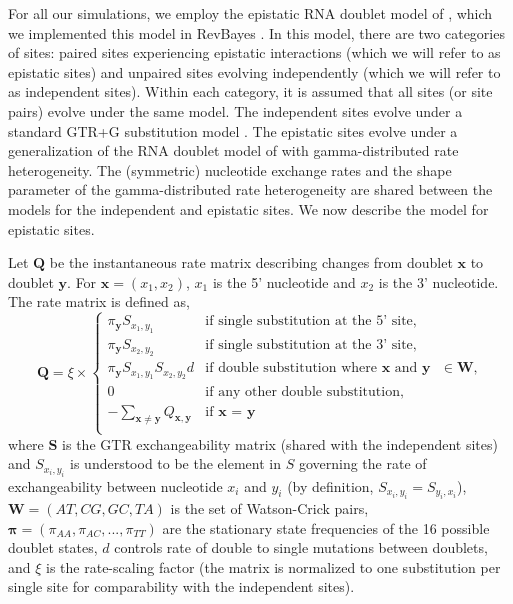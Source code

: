 \documentclass[11pt]{article}
\begin{document}
For all our simulations, we employ the epistatic RNA doublet model of \cite{nasrallah2013phylogenetic}, which we implemented this model in RevBayes \citep{hohna2016revbayes}.
In this model, there are two categories of sites: paired sites experiencing epistatic interactions (which we will refer to as epistatic sites) and unpaired sites evolving independently (which we will refer to as independent sites).
Within each category, it is assumed that all sites (or site pairs) evolve under the same model.
The independent sites evolve under a standard GTR+G substitution model \citep{tavare1986some}.
The epistatic sites evolve under a generalization of the RNA doublet model of \cite{schoniger1994stochastic} with gamma-distributed rate heterogeneity.
The (symmetric) nucleotide exchange rates and the shape parameter of the gamma-distributed rate heterogeneity are shared between the models for the independent and epistatic sites.
We now describe the model for epistatic sites.

Let $\boldsymbol{Q}$ be the instantaneous rate matrix describing changes from doublet $\boldsymbol{x}$ to doublet $\boldsymbol{y}$.
For $\boldsymbol{x} = (x_1, x_2)$, $x_1$ is the 5' nucleotide and $x_2$ is the 3' nucleotide.
The rate matrix is defined as,
\begin{equation}
\label{eq:Q}
\boldsymbol{Q} = \xi \times
\begin{cases}
   \pi_{\boldsymbol{y}} S_{x_1, y_1} & \mbox{if single substitution at the 5' site,} \\
   \pi_{\boldsymbol{y}} S_{x_2, y_2} & \mbox{if single substitution at the 3' site,} \\
   \pi_{\boldsymbol{y}} S_{x_1, y_1} S_{x_2, y_2} d & \mbox{if double substitution where ${\boldsymbol{x}}$ and ${\boldsymbol{y}}$ $\in {\boldsymbol{W}}$,} \\
   0 & \mbox{if any other double substitution,} \\
   - \sum_{\boldsymbol{x} \ne \boldsymbol{y}} Q_{\boldsymbol{x},\boldsymbol{y}}& \mbox{if $\boldsymbol{x}$ = $\boldsymbol{y}$} \\
   \end{cases}
\end{equation}
where $\boldsymbol{S}$ is the GTR exchangeability matrix (shared with the independent sites) and $S_{x_i,y_i}$ is understood to be the element in $S$ governing the rate of exchangeability between nucleotide $x_i$ and $y_i$ (by definition, $S_{x_i,y_i} = S_{y_i,x_i}$),
${\boldsymbol{W}} = (AT, CG, GC, TA)$ is the set of Watson-Crick pairs,
$\boldsymbol{\pi} = (\pi_{AA}, \pi_{AC}, ..., \pi_{TT})$ are the stationary state frequencies of the 16 possible doublet states,
$d$ controls rate of double to single mutations between doublets,
and $\xi$ is the rate-scaling factor (the matrix is normalized to one substitution per single site for comparability with the independent sites).
\end{document}
